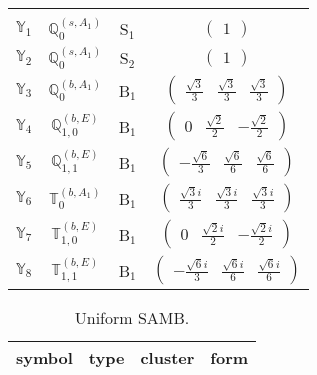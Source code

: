 \documentclass[fleqn,10pt,landscape]{article}
\begin{document}
\begin{itemize}
\begin{center}
\begin{longtable}{c|c|c|c}
 \hline \hline
\multicolumn{3}{r}{} \\ \endlastfoot

$ \mathbb{Y}_{1} $ & $\mathbb{Q}_{0}^{(s,A_{1})}$ & S$_{1}$ & $\begin{pmatrix} 1 \end{pmatrix}$ \\ \hline
$ \mathbb{Y}_{2} $ & $\mathbb{Q}_{0}^{(s,A_{1})}$ & S$_{2}$ & $\begin{pmatrix} 1 \end{pmatrix}$ \\ \hline
$ \mathbb{Y}_{3} $ & $\mathbb{Q}_{0}^{(b,A_{1})}$ & B$_{1}$ & $\begin{pmatrix} \frac{\sqrt{3}}{3} & \frac{\sqrt{3}}{3} & \frac{\sqrt{3}}{3} \end{pmatrix}$ \\
$ \mathbb{Y}_{4} $ & $\mathbb{Q}_{1,0}^{(b,E)}$ & B$_{1}$ & $\begin{pmatrix} 0 & \frac{\sqrt{2}}{2} & - \frac{\sqrt{2}}{2} \end{pmatrix}$ \\
$ \mathbb{Y}_{5} $ & $\mathbb{Q}_{1,1}^{(b,E)}$ & B$_{1}$ & $\begin{pmatrix} - \frac{\sqrt{6}}{3} & \frac{\sqrt{6}}{6} & \frac{\sqrt{6}}{6} \end{pmatrix}$ \\
$ \mathbb{Y}_{6} $ & $\mathbb{T}_{0}^{(b,A_{1})}$ & B$_{1}$ & $\begin{pmatrix} \frac{\sqrt{3} i}{3} & \frac{\sqrt{3} i}{3} & \frac{\sqrt{3} i}{3} \end{pmatrix}$ \\
$ \mathbb{Y}_{7} $ & $\mathbb{T}_{1,0}^{(b,E)}$ & B$_{1}$ & $\begin{pmatrix} 0 & \frac{\sqrt{2} i}{2} & - \frac{\sqrt{2} i}{2} \end{pmatrix}$ \\
$ \mathbb{Y}_{8} $ & $\mathbb{T}_{1,1}^{(b,E)}$ & B$_{1}$ & $\begin{pmatrix} - \frac{\sqrt{6} i}{3} & \frac{\sqrt{6} i}{6} & \frac{\sqrt{6} i}{6} \end{pmatrix}$ \\
\end{longtable}
\end{center}
\begin{center}
\renewcommand{\arraystretch}{1.3}
\begin{longtable}{c|c|c|c}
\caption{Uniform SAMB.}
 \\
 \hline \hline
symbol & type & cluster & form \\ \hline \endfirsthead


\end{longtable}
\end{center}
\end{itemize}
\end{document}
